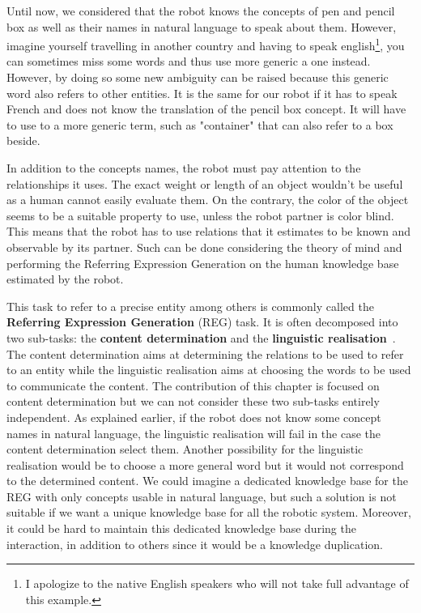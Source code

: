 Until now, we considered that the robot knows the concepts of pen and pencil box as well as their names in natural language to speak about them. However, imagine yourself travelling in another country and having to speak english\footnote{I apologize to the native English speakers who will not take full advantage of this example.}, you can sometimes miss some words and thus use more generic a one instead. However, by doing so some new ambiguity can be raised because this generic word also refers to other entities. It is the same for our robot if it has to speak French and does not know the translation of the pencil box concept. It will have to use to a more generic term, such as "container" that can also refer to a box beside.

In addition to the concepts names, the robot must pay attention to the relationships it uses. The exact weight or length of an object wouldn't be useful as a human cannot easily evaluate them. On the contrary, the color of the object seems to be a suitable property to use, unless the robot partner is color blind. This means that the robot has to use relations that it estimates to be known and observable by its partner. Such can be done considering the theory of mind and performing the Referring Expression Generation on the human knowledge base estimated by the robot.

This task to refer to a precise entity among others is commonly called the \textbf{Referring Expression Generation} (REG) task. It is often decomposed into two sub-tasks: the \textbf{content determination} and the \textbf{linguistic realisation}~\cite{krahmer_2012_computational}. The content determination aims at determining the relations to be used to refer to an entity while the linguistic realisation aims at choosing the words to be used to communicate the content. The contribution of this chapter is focused on content determination but we can not consider these two sub-tasks entirely independent. As explained earlier, if the robot does not know some concept names in natural language, the linguistic realisation will fail in the case the content determination select them. Another possibility for the linguistic realisation would be to choose a more general word but it would not correspond to the determined content. We could imagine a dedicated knowledge base for the REG with only concepts usable in natural language, but such a solution is not suitable if we want a unique knowledge base for all the robotic system. Moreover, it could be hard to maintain this dedicated knowledge base during the interaction, in addition to others since it would be a knowledge duplication.

